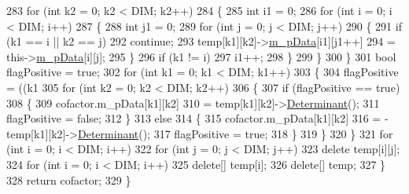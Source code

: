 \begin{DoxyCode}
283                     \textcolor{keywordflow}{for} (\textcolor{keywordtype}{int} k2 = 0; k2 < DIM; k2++)
284                     \{
285                         \textcolor{keywordtype}{int} i1 = 0;
286                         \textcolor{keywordflow}{for} (\textcolor{keywordtype}{int} i = 0; i < DIM; i++)
287                         \{
288                             \textcolor{keywordtype}{int} j1 = 0;
289                             \textcolor{keywordflow}{for} (\textcolor{keywordtype}{int} j = 0; j < DIM; j++)
290                             \{
291                                 \textcolor{keywordflow}{if} (k1 == i || k2 == j)
292                                     \textcolor{keywordflow}{continue};
293                                 temp[k1][k2]->\hyperlink{classCMatrix_ab0f18d68cad9b6d750d05a96b60a759d}{m\_pData}[i1][j1++]
294                                         = this->\hyperlink{classCMatrix_ab0f18d68cad9b6d750d05a96b60a759d}{m\_pData}[i][j];
295                             \}
296                             \textcolor{keywordflow}{if} (k1 != i)
297                                 i1++;
298                         \}
299                     \}
300                 \}
301                 \textcolor{keywordtype}{bool} flagPositive = \textcolor{keyword}{true};
302                 \textcolor{keywordflow}{for} (\textcolor{keywordtype}{int} k1 = 0; k1 < DIM; k1++)
303                 \{
304                     flagPositive = ((k1 %
305                     \textcolor{keywordflow}{for} (\textcolor{keywordtype}{int} k2 = 0; k2 < DIM; k2++)
306                     \{
307                         \textcolor{keywordflow}{if} (flagPositive == \textcolor{keyword}{true})
308                         \{
309                             cofactor.m\_pData[k1][k2]
310                                     = temp[k1][k2]->\hyperlink{classCMatrix_a865ff8f610be372e666fbf24d5b73a3a}{Determinant}();
311                             flagPositive = \textcolor{keyword}{false};
312                         \}
313                         \textcolor{keywordflow}{else}
314                         \{
315                             cofactor.m\_pData[k1][k2]
316                                     = -temp[k1][k2]->\hyperlink{classCMatrix_a865ff8f610be372e666fbf24d5b73a3a}{Determinant}();
317                             flagPositive = \textcolor{keyword}{true};
318                         \}
319                     \}
320                 \}
321                 \textcolor{keywordflow}{for} (\textcolor{keywordtype}{int} i = 0; i < DIM; i++)
322                     \textcolor{keywordflow}{for} (\textcolor{keywordtype}{int} j = 0; j < DIM; j++)
323                         \textcolor{keyword}{delete} temp[i][j];
324                 \textcolor{keywordflow}{for} (\textcolor{keywordtype}{int} i = 0; i < DIM; i++)
325                     \textcolor{keyword}{delete}[] temp[i];
326                 \textcolor{keyword}{delete}[] temp;
327             \}
328             \textcolor{keywordflow}{return} cofactor;
329         \}
\end{DoxyCode}


